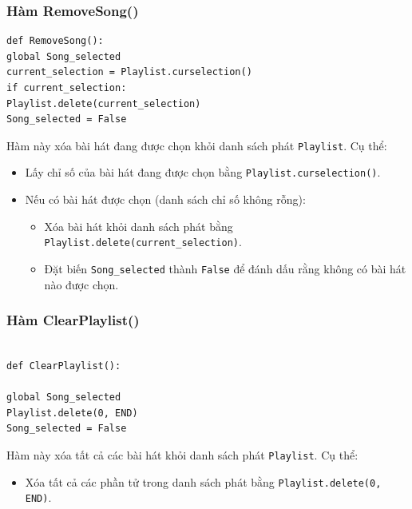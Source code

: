 \documentclass[a4paper]{article}
\begin{document}
\begin{enumerate}
\subsubsection{Hàm RemoveSong()}
\begin{mdframed}[hidealllines=true,backgroundcolor=magenta!10]
\begin{lstlisting}
def RemoveSong():
global Song_selected
current_selection = Playlist.curselection()
if current_selection:
Playlist.delete(current_selection)
Song_selected = False
\end{lstlisting}
\end{mdframed}
Hàm này xóa bài hát đang được chọn khỏi danh sách phát \texttt{Playlist}. Cụ thể:
\begin{itemize}
\item Lấy chỉ số của bài hát đang được chọn bằng \texttt{Playlist.curselection()}.
\item Nếu có bài hát được chọn (danh sách chỉ số không rỗng):
\begin{itemize}
\item Xóa bài hát khỏi danh sách phát bằng \texttt{Playlist.delete(current_selection)}.
\item Đặt biến \texttt{Song_selected} thành \texttt{False} để đánh dấu rằng không có bài hát nào được chọn.
\end{itemize}
\end{itemize}
\subsubsection{Hàm ClearPlaylist()}
\begin{mdframed}[hidealllines=true,backgroundcolor=magenta!10]
\begin{lstlisting}

def ClearPlaylist():

global Song_selected
Playlist.delete(0, END)
Song_selected = False
\end{lstlisting}
\end{mdframed}
Hàm này xóa tất cả các bài hát khỏi danh sách phát \texttt{Playlist}. Cụ thể:
\begin{itemize}
\item Xóa tất cả các phần tử trong danh sách phát bằng \texttt{Playlist.delete(0, END)}.

\end{itemize}


\end{enumerate}
\end{document}
